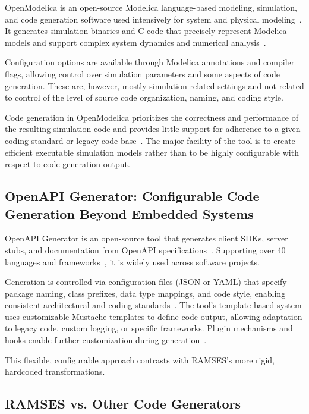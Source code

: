 OpenModelica is an open-source Modelica language-based modeling, simulation, and code generation software used intensively for system and physical modeling~\cite{openmodelica-home}. It generates simulation binaries and C code that precisely represent Modelica models and support complex system dynamics and numerical analysis~\cite{openmodelica-codegen}.

Configuration options are available through Modelica annotations and compiler flags, allowing control over simulation parameters and some aspects of code generation. These are, however, mostly simulation-related settings and not related to control of the level of source code organization, naming, and coding style.

Code generation in OpenModelica prioritizes the correctness and performance of the resulting simulation code and provides little support for adherence to a given coding standard or legacy code base~\cite{openmodelica-performance}. The major facility of the tool is to create efficient executable simulation models rather than to be highly configurable with respect to code generation output.


\subsection{OpenAPI Generator: Configurable Code Generation Beyond Embedded Systems}
\label{sec:openApi}

OpenAPI Generator is an open-source tool that generates client SDKs, server stubs, and documentation from OpenAPI specifications~\cite{OpenAPITools}. Supporting over 40 languages and frameworks~\cite{openapi-generators}, it is widely used across software projects.

Generation is controlled via configuration files (JSON or \gls{YAML}) that specify package naming, class prefixes, data type mappings, and code style, enabling consistent architectural and coding standards~\cite{openapi-config}. The tool’s template-based system uses customizable Mustache templates to define code output, allowing adaptation to legacy code, custom logging, or specific frameworks. Plugin mechanisms and hooks enable further customization during generation~\cite{openapi-customization,openapi-plugins}.

This flexible, configurable approach contrasts with \gls{RAMSES}’s more rigid, hardcoded transformations.


\subsection{RAMSES vs. Other Code Generators}
\label{sec:ramses_vs_others}

